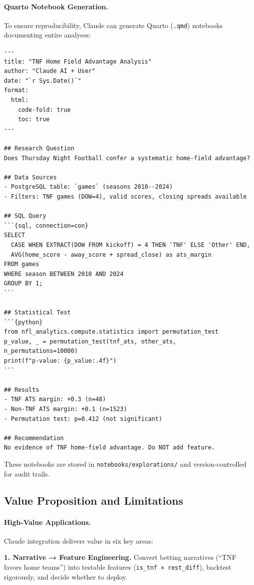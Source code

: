 \paragraph{Quarto Notebook Generation.}
To ensure reproducibility, Claude can generate Quarto (\texttt{.qmd}) notebooks documenting entire analyses:
\begin{verbatim}
---
title: "TNF Home Field Advantage Analysis"
author: "Claude AI + User"
date: "`r Sys.Date()`"
format:
  html:
    code-fold: true
    toc: true
---

## Research Question
Does Thursday Night Football confer a systematic home-field advantage?

## Data Sources
- PostgreSQL table: `games` (seasons 2010--2024)
- Filters: TNF games (DOW=4), valid scores, closing spreads available

## SQL Query
```{sql, connection=con}
SELECT
  CASE WHEN EXTRACT(DOW FROM kickoff) = 4 THEN 'TNF' ELSE 'Other' END,
  AVG(home_score - away_score + spread_close) as ats_margin
FROM games
WHERE season BETWEEN 2010 AND 2024
GROUP BY 1;
```

## Statistical Test
```{python}
from nfl_analytics.compute.statistics import permutation_test
p_value, _ = permutation_test(tnf_ats, other_ats, n_permutations=10000)
print(f"p-value: {p_value:.4f}")
```

## Results
- TNF ATS margin: +0.3 (n=48)
- Non-TNF ATS margin: +0.1 (n=1523)
- Permutation test: p=0.412 (not significant)

## Recommendation
No evidence of TNF home-field advantage. Do NOT add feature.
\end{verbatim}

These notebooks are stored in \texttt{notebooks/explorations/} and version‑controlled for audit trails.

\subsection{Value Proposition and Limitations}
\label{subsec:value_limitations}

\paragraph{High‑Value Applications.}
Claude integration delivers value in six key areas:

\textbf{1. Narrative → Feature Engineering.} Convert betting narratives (``TNF favors home teams'') into testable features (\texttt{is\_tnf × rest\_diff}), backtest rigorously, and decide whether to deploy.

